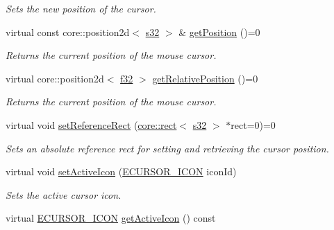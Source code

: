 \begin{DoxyCompactItemize}
\begin{DoxyCompactList}\small\item\em Sets the new position of the cursor. \end{DoxyCompactList}\item 
virtual const core\+::position2d$<$ \hyperlink{namespaceirr_ac66849b7a6ed16e30ebede579f9b47c6}{s32} $>$ \& \hyperlink{classirr_1_1gui_1_1ICursorControl_a65d9f6e734baa02be69b7e9f5fbdd565}{get\+Position} ()=0
\begin{DoxyCompactList}\small\item\em Returns the current position of the mouse cursor. \end{DoxyCompactList}\item 
virtual core\+::position2d$<$ \hyperlink{namespaceirr_a0277be98d67dc26ff93b1a6a1d086b07}{f32} $>$ \hyperlink{classirr_1_1gui_1_1ICursorControl_a8ba1cb0ff11edc5fb32cdadddece09f8}{get\+Relative\+Position} ()=0
\begin{DoxyCompactList}\small\item\em Returns the current position of the mouse cursor. \end{DoxyCompactList}\item 
virtual void \hyperlink{classirr_1_1gui_1_1ICursorControl_a2a7428ef716a60f8f4b86361a69b8770}{set\+Reference\+Rect} (\hyperlink{classirr_1_1core_1_1rect}{core\+::rect}$<$ \hyperlink{namespaceirr_ac66849b7a6ed16e30ebede579f9b47c6}{s32} $>$ $\ast$rect=0)=0
\begin{DoxyCompactList}\small\item\em Sets an absolute reference rect for setting and retrieving the cursor position. \end{DoxyCompactList}\item 
virtual void \hyperlink{classirr_1_1gui_1_1ICursorControl_af394700d5279b13cc0f2bcdad679469c}{set\+Active\+Icon} (\hyperlink{namespaceirr_1_1gui_aefee802dd632c5735703e40ef40f879b}{E\+C\+U\+R\+S\+O\+R\+\_\+\+I\+C\+ON} icon\+Id)
\begin{DoxyCompactList}\small\item\em Sets the active cursor icon. \end{DoxyCompactList}\item 
virtual \hyperlink{namespaceirr_1_1gui_aefee802dd632c5735703e40ef40f879b}{E\+C\+U\+R\+S\+O\+R\+\_\+\+I\+C\+ON} \hyperlink{classirr_1_1gui_1_1ICursorControl_a6c08f4adefe397b8054296151f15f2ad}{get\+Active\+Icon} () const \hypertarget{classirr_1_1gui_1_1ICursorControl_a6c08f4adefe397b8054296151f15f2ad}{}\label{classirr_1_1gui_1_1ICursorControl_a6c08f4adefe397b8054296151f15f2ad}


\end{DoxyCompactItemize}
